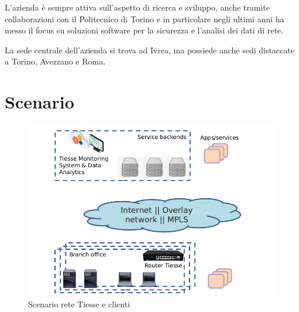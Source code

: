 L'azienda è sempre attiva sull'aspetto di ricerca e sviluppo, anche tramite collaborazioni con il Politecnico di Torino e in particolare negli ultimi anni ha messo il focus su soluzioni software per la sicurezza e l'analisi dei dati di rete.

La sede centrale dell'azienda si trova ad Ivrea, ma possiede anche sedi distaccate a Torino, Avezzano e Roma.



\section{Scenario}
\begin{figure}[]
    \includegraphics[width=\hsize]{images/introduzione/scenario_2.png}
    \caption{Scenario rete Tiesse e clienti}
    \label{fig:scenario_1}
    \centering    

\end{figure}

